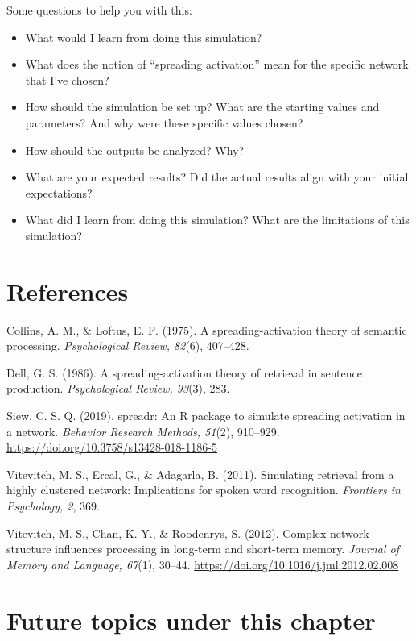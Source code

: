 \documentclass[
]{book}
\providecommand{\tightlist}{%
  \setlength{\itemsep}{0pt}\setlength{\parskip}{0pt}}
\begin{document}
Some questions to help you with this:

\begin{itemize}
\tightlist
\item
  What would I learn from doing this simulation?
\item
  What does the notion of ``spreading activation'' mean for the specific network that I've chosen?
\item
  How should the simulation be set up? What are the starting values and parameters? And why were these specific values chosen?
\item
  How should the outputs be analyzed? Why?
\item
  What are your expected results? Did the actual results align with your initial expectations?
\item
  What did I learn from doing this simulation? What are the limitations of this simulation?
\end{itemize}

\section{References}\label{references}

Collins, A. M., \& Loftus, E. F. (1975). A spreading-activation theory of semantic processing. \emph{Psychological Review, 82}(6), 407--428.

Dell, G. S. (1986). A spreading-activation theory of retrieval in sentence production. \emph{Psychological Review, 93}(3), 283.

Siew, C. S. Q. (2019). spreadr: An R package to simulate spreading activation in a network. \emph{Behavior Research Methods, 51}(2), 910--929. \url{https://doi.org/10.3758/s13428-018-1186-5}

Vitevitch, M. S., Ercal, G., \& Adagarla, B. (2011). Simulating retrieval from a highly clustered network: Implications for spoken word recognition. \emph{Frontiers in Psychology, 2}, 369.

Vitevitch, M. S., Chan, K. Y., \& Roodenrys, S. (2012). Complex network structure influences processing in long-term and short-term memory. \emph{Journal of Memory and Language, 67}(1), 30--44. \url{https://doi.org/10.1016/j.jml.2012.02.008}

\section{Future topics under this chapter}\label{future-topics-under-this-chapter}
\end{document}
